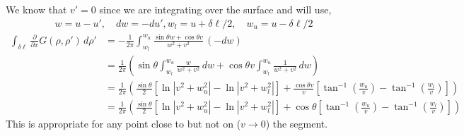 \documentclass{article}
\newcommand{\0}{\varnothing}
\begin{document}
\noindent We know that $v'=0$ since we are integrating over the surface and will use, 
\begin{align*}
    w = u - u', \quad dw = - du', w_l = u + \delta \ell/2, \quad  w_u = u - \delta \ell/2
\end{align*}
\begin{align*}
    \int_{\delta\ell}\frac{\partial}{\partial x}G(\rho,\rho')\, d\rho' 
    &= -\frac{1}{2\pi}\int_{w_l}^{w_u}\frac{\sin{\theta}w + \cos{\theta} v}{w^2 + v^2}\,(-dw)\\
    &= \frac{1}{2\pi}\left( \sin{\theta} \int_{w_l}^{w_u}\frac{w}{w^2 + v^2}\,dw + \cos{\theta} v\int_{w_l}^{w_u}\frac{1}{w^2 + v^2}\,dw \right)\\
    &= \frac{1}{2\pi}\left( \frac{\sin{\theta}}{2} \left[ \ln |v^2 + w_u^2| - \ln |v^2 + w_l^2|\right] + \frac{\cos{\theta} v}{v} \left[ \tan^{-1} \left( \frac{w_u}{v} \right) -  \tan^{-1} \left( \frac{w_l}{v} \right)\right] \right)\\\textbf{}
    &= \frac{1}{2\pi}\left( \frac{\sin{\theta}}{2} \left[ \ln |v^2 + w_u^2| - \ln |v^2 + w_l^2|\right] + \cos{\theta} \left[ \tan^{-1} \left( \frac{w_u}{v} \right) -  \tan^{-1} \left( \frac{w_l}{v} \right)\right] \right)
\end{align*}
This is appropriate for any point close to but not on ($v \to 0$) the segment.
\end{document}
